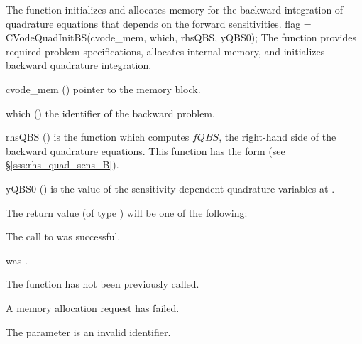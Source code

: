 The function  initializes and allocates memory for the backward
integration of quadrature equations that depends on the forward sensitivities.
{
flag = CVodeQuadInitBS(cvode\_mem, which, rhsQBS, yQBS0);
}
{
  The function  provides required problem specifications,
  allocates internal memory, and initializes backward quadrature integration.
}
{
  \begin{args}
  \item[cvode\_mem] ()
    pointer to the {\cvodes} memory block.
  \item[which] ()
    the identifier of the backward problem.
  \item[rhsQBS] ()
    is the {\CC} function which computes $fQBS$, the right-hand side of the
    backward quadrature equations. This function has the form
    (see \S\ref{sss:rhs_quad_sens_B}).
  \item[yQBS0] ()
    is the value of the sensitivity-dependent quadrature variables at .
  \end{args}
}
{
  The return value  (of type ) will be one of the following:
  \begin{args}
  \item[\Id{CV\_SUCCESS}]
    The call to  was successful.
  \item[\Id{CV\_MEM\_NULL}]
     was .
  \item[\Id{CV\_NO\_ADJ}]
    The function  has not been previously called.
  \item[\Id{CV\_MEM\_FAIL}]
    A memory allocation request has failed.
  \item[\Id{CV\_ILL\_INPUT}]
    The parameter  is an invalid identifier.
  \end{args}
}
{}


